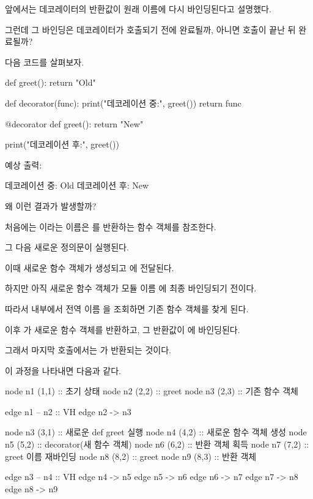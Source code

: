앞에서는 데코레이터의 반환값이 원래 이름에 다시 바인딩된다고 설명했다.

그런데 그 바인딩은 데코레이터가 호출되기 전에 완료될까, 아니면 호출이 끝난 뒤 완료될까?

다음 코드를 살펴보자.

\begin{dhkcode}
def greet():
    return "Old"


def decorator(func):
    print("데코레이션 중:", greet())
    return func


@decorator
def greet():
    return "New"


print("데코레이션 후:", greet())
\end{dhkcode}

예상 출력:

\begin{dhkzsh}
데코레이션 중: Old
데코레이션 후: New
\end{dhkzsh}

왜 이런 결과가 발생할까?

처음에는 이라는 이름은 를 반환하는 함수 객체를 참조한다.

그 다음 새로운  정의문이 실행된다.

이때 새로운 함수 객체가 생성되고 에 전달된다.

하지만 아직 새로운 함수 객체가 모듈 이름 에 최종 바인딩되기 전이다.

따라서  내부에서 전역 이름 을 조회하면 기존 함수 객체를 찾게 된다.

이후 가 새로운 함수 객체를 반환하고, 그 반환값이 에 바인딩된다.

그래서 마지막 호출에서는 가 반환되는 것이다.

이 과정을 나타내면 다음과 같다.

\begin{dhkdiagram}[in=6]
node n1 (1,1) :: 초기 상태
node n2 (2,2) :: greet
node n3 (2,3) :: 기존 함수 객체

edge n1 -- n2 :: VH
edge n2 -> n3
\end{dhkdiagram}

\begin{dhkdiagram}[in=2]
node n3 (3,1) :: 새로운 def greet 실행
node n4 (4,2) :: 새로운 함수 객체 생성
node n5 (5,2) :: decorator(새 함수 객체)
node n6 (6,2) :: 반환 객체 획득
node n7 (7,2) :: greet 이름 재바인딩
node n8 (8,2) :: greet
node n9 (8,3) :: 반환 객체

edge n3 -- n4 :: VH
edge n4 -> n5
edge n5 -> n6
edge n6 -> n7
edge n7 -> n8
edge n8 -> n9
\end{dhkdiagram}

